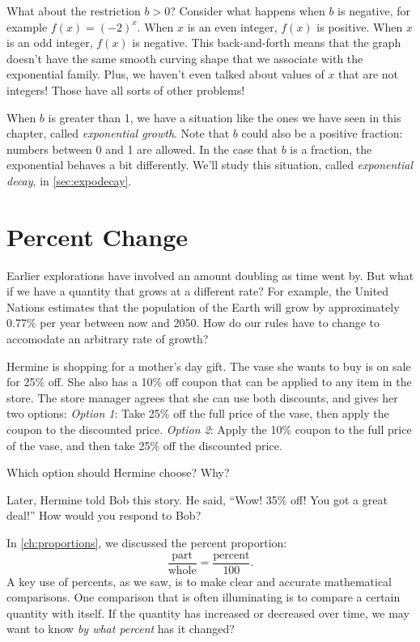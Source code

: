 What about the restriction $b>0$? Consider what happens when $b$ is negative, for example $f(x)=(-2)^x$. When $x$ is an even integer, $f(x)$ is positive. When $x$ is an odd integer, $f(x)$ is negative. This back-and-forth means that the graph doesn't have the same smooth curving shape that we associate with the exponential family. Plus, we haven't even talked about values of $x$ that are not integers! Those have all sorts of other problems!

When $b$ is greater than 1, we have a situation like the ones we have seen in this chapter, called \textit{exponential growth}. Note that $b$ could also be a positive fraction: numbers between 0 and 1 are allowed. In the case that $b$ is a fraction, the exponential behaves a bit differently. We'll study this situation, called \textit{exponential decay}, in \cref{sec:expodecay}.


\section{Percent Change}
\label{sec:expopercentchange}

Earlier explorations have involved an amount doubling as time went by. But what if we have a quantity that grows at a different rate? For example, the United Nations estimates that the population of the Earth will grow by approximately 0.77\% per year between now and 2050. How do our rules have to change to accomodate an arbitrary rate of growth?

\begin{boxedexplore}
Hermine is shopping for a mother's day gift. The vase she wants to buy is on sale for 25\% off. She also has a 10\% off coupon that can be applied to any item in the store. The store manager agrees that she can use both discounts, and gives her two options: \textit{Option 1}: Take 25\% off the full price of the vase, then apply the coupon to the discounted price. \textit{Option 2}: Apply the 10\% coupon to the full price of the vase, and then take 25\% off the discounted price.

Which option should Hermine choose? Why?

Later, Hermine told Bob this story. He said, ``Wow! 35\% off! You got a great deal!'' How would you respond to Bob?
\end{boxedexplore}

In \cref{ch:proportions}, we discussed the percent proportion:
\[\frac{\text{part}}{\text{whole}} = \frac{\text{percent}}{100}.\]
A key use of percents, as we saw, is to make clear and accurate mathematical comparisons. One comparison that is often illuminating is to compare a certain quantity with itself. If the quantity has increased or decreased over time, we may want to know \textit{by what percent} has it changed?

